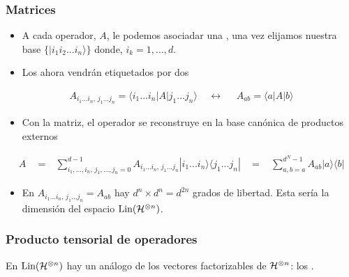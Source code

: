 \documentclass[letterpaper,10pt,english]{jupyterBook}
\newcommand{\bra}[1]{\langle #1|}
\newcommand{\ket}[1]{|#1\rangle}
\newcommand{\Hil}{{\cal H}}
\newcommand{\Lin}{\hbox{Lin}}
\begin{document}
\subsubsection{Matrices}
\label{\detokenize{docs/Part_01_Formalismo/Chapter_01_02_Formalismo_matem_xe1tico/01_04_Tensores_myst:matrices}}\begin{itemize}
\item {} 
\sphinxAtStartPar
A cada operador, \(A\), le podemos asociadar una , una vez elijamos nuestra base  \(\{ \ket{i_1 i_2... i_n}\}\) donde, \(i_k = 1,...,d\).

\item {} 
\sphinxAtStartPar
Los  ahora vendrán etiquetados por dos 

\end{itemize}
\begin{equation*}
\begin{split}
 A_{i_1...i_n, \, j_1...j_n} = \bra{i_1...i_n}A\ket{j_1...j_n}  ~~~~~\leftrightarrow ~~~~~~ A_{ab}= \bra{a}A\ket{b}
 \end{split}
\end{equation*}\begin{itemize}
\item {} 
\sphinxAtStartPar
Con la matriz, el operador se reconstruye en la base canónica de productos externos

\end{itemize}
\label{equation:docs/Part_01_Formalismo/Chapter_01_02_Formalismo_matemático/01_04_Tensores_myst:22de7721-40ee-4af2-9ccf-9557c363a1df}\begin{eqnarray} 
 A &~~=~& 
 \sum_{i_1,...,i_n,\, j_1,...,j_n=0}^{d-1} A_{i_1...i_n, \, j_1...j_n} \ket{i_1...i_n}\bra{j_1...j_n}
 ~~~~=~~~~
  \sum_{a,b=a}^{d^{N}-1} A_{ab} \ket{a}\bra{b}
\end{eqnarray}\begin{itemize}
\item {} 
\sphinxAtStartPar
En \(A_{i_1...i_n,\,j_1...j_n} = A_{ab}\) hay \(d^n\times d^n = d^{2n}\) grados de libertad. Esta sería la dimensión del espacio  \(\Lin(\Hil^{\otimes n})\).

\end{itemize}


\subsubsection{Producto tensorial de operadores}
\label{\detokenize{docs/Part_01_Formalismo/Chapter_01_02_Formalismo_matem_xe1tico/01_04_Tensores_myst:producto-tensorial-de-operadores}}
\sphinxAtStartPar
En \(\Lin(\Hil^{\otimes n})\) hay un análogo de los vectores factorizables de \(\Hil^{\otimes n}\): los .
\end{document}
